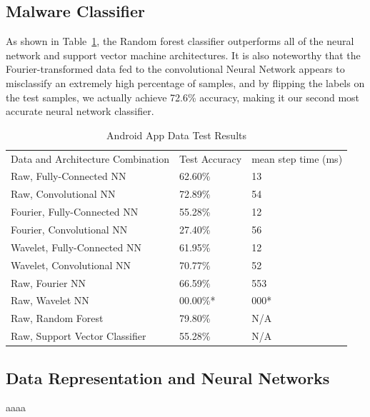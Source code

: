 \documentclass[10pt]{article}
\begin{document}
\subsection{Malware Classifier} \label{malware classifier}
As shown in Table~\ref{Tab:test}, the Random forest classifier outperforms all of the neural network and support vector machine architectures.
It is also noteworthy that the Fourier-transformed data fed to the convolutional Neural Network appears to misclassify an extremely high percentage of samples, and by flipping the labels on the test samples, we actually achieve 72.6\% accuracy, making it our second most accurate neural network classifier.

 
\begin{table}[h]
\caption{Android App Data Test Results}
\centering
\label{Tab:test}	
\begin{tabular}{lll}
Data and Architecture Combination & Test Accuracy & mean step time (ms) \\
Raw, Fully-Connected NN           & 62.60\%         & 13                  \\
Raw, Convolutional NN             & 72.89\%         & 54                  \\
Fourier, Fully-Connected NN       & 55.28\%       & 12                  \\
Fourier, Convolutional NN         & 27.40\%         & 56                  \\
Wavelet, Fully-Connected NN       & 61.95\%         & 12                  \\
Wavelet, Convolutional NN         & 70.77\%         & 52                  \\
Raw, Fourier NN                   & 66.59\%         & 553                 \\
Raw, Wavelet NN                   & 00.00\%*        & 000*                \\
Raw, Random Forest                & 79.80\%         & N/A                 \\
Raw, Support Vector Classifier    & 55.28\%         & N/A                
\end{tabular}
\end{table}
 
\subsection{Data Representation and Neural Networks} \label{data representation}
aaaa
\end{document}
